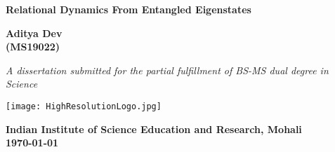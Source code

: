 \begin{titlepage}

    \begin{center}
        \sffamily
        \LARGE
        \textbf{Relational Dynamics From Entangled Eigenstates}
        \vspace{1cm}
        
        \Large
        \textbf{Aditya Dev \\ \large (MS19022)}
    
        \vspace{1cm}
        \large
        
        \textit{A dissertation submitted for the partial fulfillment of BS-MS dual degree in Science}
        
        \vspace{2.5cm}
    
        \texttt{[image: HighResolutionLogo.jpg]}
        \vspace{1cm}
        
        \large
        \textbf{Indian Institute of Science Education and Research, Mohali}\\
        \large
        \textbf{\today} 
    
    \end{center}
    
    
    \end{titlepage}
